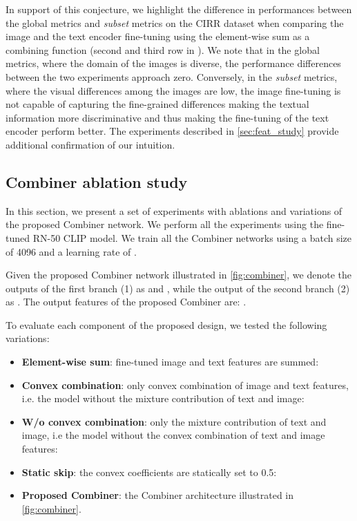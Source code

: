 \documentclass[acmlarge]{acmart}
\begin{document}
In support of this conjecture, we highlight the difference in performances between the global metrics and \textit{subset} metrics on the CIRR dataset when comparing the image and the text encoder fine-tuning using the element-wise sum as a combining function (second and third row in ). 
We note that in the global metrics, where the domain of the images is diverse, the performance differences between the two experiments approach zero. Conversely, in the \textit{subset} metrics, where the visual differences among the images are low, the image fine-tuning is not capable of capturing the fine-grained differences making the textual information more discriminative and thus making the fine-tuning of the text encoder perform better.
The experiments described in \cref{sec:feat_study} provide additional confirmation of our intuition.


\subsection{Combiner ablation study}\label{sec:ablation}
In this section, we present a set of experiments with ablations and variations of the proposed Combiner network. We perform all the experiments using the fine-tuned RN-50 CLIP model. We train all the Combiner networks using a batch size of 4096 and a learning rate of .

Given the proposed Combiner network illustrated in \cref{fig:combiner}, we denote the outputs of the first branch (1) as  and , while the output of the second branch (2) as .
The output features of the proposed Combiner are: .

To evaluate each component of the proposed design, we tested the following variations:


\begin{itemize}
    \item \textbf{Element-wise sum}: fine-tuned image and text features are summed: 
    \item \textbf{Convex combination}: only convex combination of image and text features, i.e. the model without the mixture contribution of text and image: 
    \item \textbf{W/o convex combination}: only the mixture contribution of text and image, i.e the model without the convex combination of text and image features: 
\item \textbf{Static skip}: the convex coefficients are statically set to 0.5: 
\item \textbf{Proposed Combiner}: the Combiner architecture illustrated in \cref{fig:combiner}.
\end{itemize}
\end{document}

